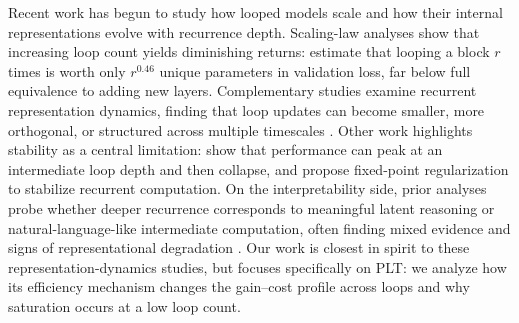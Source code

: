 
Recent work has begun to study how looped models scale and how their internal representations evolve with recurrence depth. Scaling-law analyses show that increasing loop count yields diminishing returns: \citet{schwethelm2026how} estimate that looping a block $r$ times is worth only $r^{0.46}$ unique parameters in validation loss, far below full equivalence to adding new layers. Complementary studies examine recurrent representation dynamics, finding that loop updates can become smaller, more orthogonal, or structured across multiple timescales \citep{pappone2025twoscale}. Other work highlights stability as a central limitation: \citet{yang2026stabilizing} show that performance can peak at an intermediate loop depth and then collapse, and propose fixed-point regularization to stabilize recurrent computation. On the interpretability side, prior analyses probe whether deeper recurrence corresponds to meaningful latent reasoning or natural-language-like intermediate computation, often finding mixed evidence and signs of representational degradation \citep{chen2026loop,lu2025latent}. Our work is closest in spirit to these representation-dynamics studies, but focuses specifically on PLT: we analyze how its efficiency mechanism changes the gain--cost profile across loops and why saturation occurs at a low loop count.
